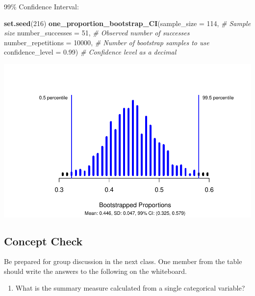 \documentclass[
]{report}
\newenvironment{Shaded}{\begin{snugshade}}{\end{snugshade}}
\newcommand{\AttributeTok}[1]{\textcolor[rgb]{0.13,0.29,0.53}{#1}}
\newcommand{\CommentTok}[1]{\textcolor[rgb]{0.56,0.35,0.01}{\textit{#1}}}
\newcommand{\DecValTok}[1]{\textcolor[rgb]{0.00,0.00,0.81}{#1}}
\newcommand{\FloatTok}[1]{\textcolor[rgb]{0.00,0.00,0.81}{#1}}
\newcommand{\FunctionTok}[1]{\textcolor[rgb]{0.13,0.29,0.53}{\textbf{#1}}}
\newcommand{\NormalTok}[1]{#1}
\providecommand{\tightlist}{%
  \setlength{\itemsep}{0pt}\setlength{\parskip}{0pt}}
\begin{document}
99\% Confidence Interval:

\begin{Shaded}
\begin{Highlighting}[]
\FunctionTok{set.seed}\NormalTok{(}\DecValTok{216}\NormalTok{)}
\FunctionTok{one\_proportion\_bootstrap\_CI}\NormalTok{(}\AttributeTok{sample\_size =} \DecValTok{114}\NormalTok{, }\CommentTok{\# Sample size}
                    \AttributeTok{number\_successes =} \DecValTok{51}\NormalTok{, }\CommentTok{\# Observed number of successes}
                    \AttributeTok{number\_repetitions =} \DecValTok{10000}\NormalTok{, }\CommentTok{\# Number of bootstrap samples to use}
                    \AttributeTok{confidence\_level =} \FloatTok{0.99}\NormalTok{) }\CommentTok{\# Confidence level as a decimal}
\end{Highlighting}
\end{Shaded}

\begin{center}\includegraphics[width=0.7\linewidth]{03-VN03-EDA_OneCatSimulation_files/figure-latex/unnamed-chunk-11-1} \end{center}

\subsection{Concept Check}\label{concept-check-3}

Be prepared for group discussion in the next class. One member from the table should write the answers to the following on the whiteboard.

\begin{enumerate}
\def\labelenumi{\arabic{enumi}.}
\tightlist
\item
  What is the summary measure calculated from a single categorical variable?
\end{enumerate}

\vspace{0.3in}
\end{document}
